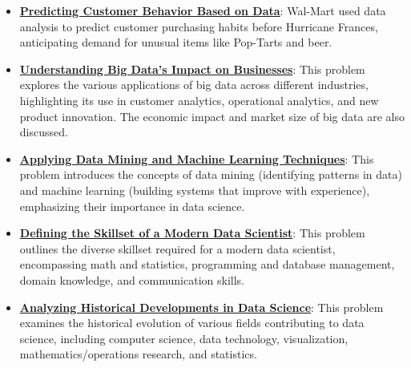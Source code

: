 \documentclass{article}%
\begin{document}
\begin{itemize}[leftmargin=*]%
\item \href{https://purdue.brightspace.com/d2l/common/assets/pdfjs-d2l-dist/1.0.14-legacy/web/viewer.html?file=\%2Fcontent\%2Fenforced\%2F1095465-WL.202510.CS24200.LE1\%2F02L1-datas-intro.pdf\%3Fou\%3D1095465\&lang=en-us\&container=d2l-fileviewer-rendered-pdf\&fullscreen=d2l-fileviewer-rendered-pdf-dialog\&height=667#page=5}{\textbf{Predicting Customer Behavior Based on Data}}: Wal-Mart used data analysis to predict customer purchasing habits before Hurricane Frances, anticipating demand for unusual items like Pop-Tarts and beer.%
\item \href{https://purdue.brightspace.com/d2l/common/assets/pdfjs-d2l-dist/1.0.14-legacy/web/viewer.html?file=\%2Fcontent\%2Fenforced\%2F1095465-WL.202510.CS24200.LE1\%2F02L1-datas-intro.pdf\%3Fou\%3D1095465\&lang=en-us\&container=d2l-fileviewer-rendered-pdf\&fullscreen=d2l-fileviewer-rendered-pdf-dialog\&height=667#page=6}{\textbf{Understanding Big Data's Impact on Businesses}}: This problem explores the various applications of big data across different industries, highlighting its use in customer analytics, operational analytics, and new product innovation. The economic impact and market size of big data are also discussed.%
\item \href{https://purdue.brightspace.com/d2l/common/assets/pdfjs-d2l-dist/1.0.14-legacy/web/viewer.html?file=\%2Fcontent\%2Fenforced\%2F1095465-WL.202510.CS24200.LE1\%2F02L1-datas-intro.pdf\%3Fou\%3D1095465\&lang=en-us\&container=d2l-fileviewer-rendered-pdf\&fullscreen=d2l-fileviewer-rendered-pdf-dialog\&height=667#page=7}{\textbf{Applying Data Mining and Machine Learning Techniques}}: This problem introduces the concepts of data mining (identifying patterns in data) and machine learning (building systems that improve with experience), emphasizing their importance in data science.%
\item \href{https://purdue.brightspace.com/d2l/common/assets/pdfjs-d2l-dist/1.0.14-legacy/web/viewer.html?file=\%2Fcontent\%2Fenforced\%2F1095465-WL.202510.CS24200.LE1\%2F02L1-datas-intro.pdf\%3Fou\%3D1095465\&lang=en-us\&container=d2l-fileviewer-rendered-pdf\&fullscreen=d2l-fileviewer-rendered-pdf-dialog\&height=667#page=9}{\textbf{Defining the Skillset of a Modern Data Scientist}}: This problem outlines the diverse skillset required for a modern data scientist, encompassing math and statistics, programming and database management, domain knowledge, and communication skills.%
\item \href{https://purdue.brightspace.com/d2l/common/assets/pdfjs-d2l-dist/1.0.14-legacy/web/viewer.html?file=\%2Fcontent\%2Fenforced\%2F1095465-WL.202510.CS24200.LE1\%2F02L1-datas-intro.pdf\%3Fou\%3D1095465\&lang=en-us\&container=d2l-fileviewer-rendered-pdf\&fullscreen=d2l-fileviewer-rendered-pdf-dialog\&height=667#page=10}{\textbf{Analyzing Historical Developments in Data Science}}: This problem examines the historical evolution of various fields contributing to data science, including computer science, data technology, visualization, mathematics/operations research, and statistics.%

\end{itemize}
\end{document}
